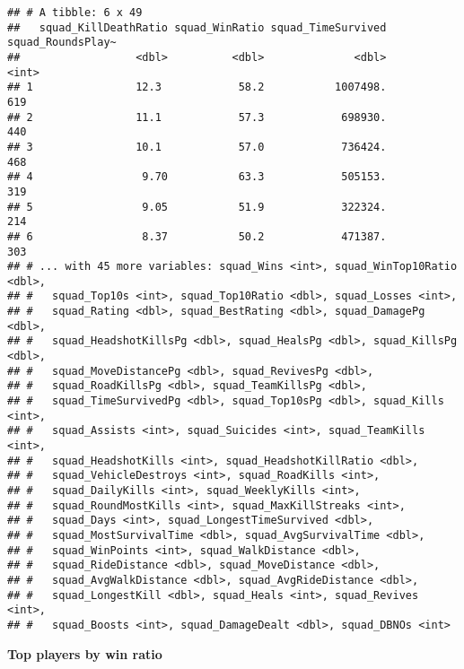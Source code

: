 \documentclass[]{article}
\begin{document}
\begin{verbatim}
## # A tibble: 6 x 49
##   squad_KillDeathRatio squad_WinRatio squad_TimeSurvived squad_RoundsPlay~
##                  <dbl>          <dbl>              <dbl>             <int>
## 1                12.3            58.2           1007498.               619
## 2                11.1            57.3            698930.               440
## 3                10.1            57.0            736424.               468
## 4                 9.70           63.3            505153.               319
## 5                 9.05           51.9            322324.               214
## 6                 8.37           50.2            471387.               303
## # ... with 45 more variables: squad_Wins <int>, squad_WinTop10Ratio <dbl>,
## #   squad_Top10s <int>, squad_Top10Ratio <dbl>, squad_Losses <int>,
## #   squad_Rating <dbl>, squad_BestRating <dbl>, squad_DamagePg <dbl>,
## #   squad_HeadshotKillsPg <dbl>, squad_HealsPg <dbl>, squad_KillsPg <dbl>,
## #   squad_MoveDistancePg <dbl>, squad_RevivesPg <dbl>,
## #   squad_RoadKillsPg <dbl>, squad_TeamKillsPg <dbl>,
## #   squad_TimeSurvivedPg <dbl>, squad_Top10sPg <dbl>, squad_Kills <int>,
## #   squad_Assists <int>, squad_Suicides <int>, squad_TeamKills <int>,
## #   squad_HeadshotKills <int>, squad_HeadshotKillRatio <dbl>,
## #   squad_VehicleDestroys <int>, squad_RoadKills <int>,
## #   squad_DailyKills <int>, squad_WeeklyKills <int>,
## #   squad_RoundMostKills <int>, squad_MaxKillStreaks <int>,
## #   squad_Days <int>, squad_LongestTimeSurvived <dbl>,
## #   squad_MostSurvivalTime <dbl>, squad_AvgSurvivalTime <dbl>,
## #   squad_WinPoints <int>, squad_WalkDistance <dbl>,
## #   squad_RideDistance <dbl>, squad_MoveDistance <dbl>,
## #   squad_AvgWalkDistance <dbl>, squad_AvgRideDistance <dbl>,
## #   squad_LongestKill <dbl>, squad_Heals <int>, squad_Revives <int>,
## #   squad_Boosts <int>, squad_DamageDealt <dbl>, squad_DBNOs <int>
\end{verbatim}

\textbf{Top players by win ratio}
\end{document}
